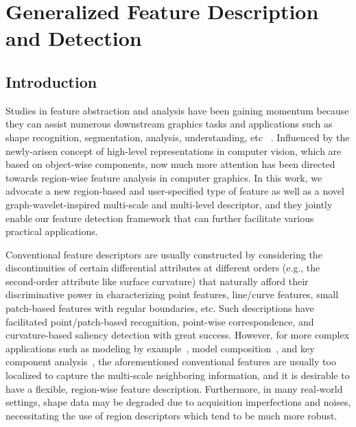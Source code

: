 \chapter{Generalized Feature Description and Detection}

\section{Introduction}

Studies in feature abstraction and analysis have been
gaining momentum because they can assist numerous downstream graphics
tasks and applications such as shape recognition, segmentation,
analysis, understanding, etc
~\cite{Bronstein2011,Kin-ChungAu:2012,Song:2014:MSV}. Influenced
by the newly-arisen concept of high-level representations in computer
vision, which are based on object-wise components, now much more
attention has been directed towards region-wise feature analysis in
computer graphics. In this work, we advocate a new region-based and
user-specified type of feature as well as a novel
graph-wavelet-inspired multi-scale and multi-level descriptor, and they
jointly enable our feature detection framework that can further
facilitate various practical applications.

Conventional feature descriptors are usually constructed by considering
the discontinuities of certain differential attributes at different
orders (e.g., the second-order attribute like surface curvature) that
naturally afford their discriminative power in characterizing point
features, line/curve features, small patch-based features with regular
boundaries, etc. Such descriptions have facilitated point/patch-based
recognition, point-wise correspondence, and curvature-based saliency
detection with great success. However, for more complex applications
such as modeling by example~\cite{Funkhouser:2004}, model
composition~\cite{Kreavoy:2007}, and key component
analysis~\cite{Sipiran:2012}, the aforementioned conventional features
are usually too localized to capture the multi-scale neighboring
information, and it is desirable to have a flexible, region-wise feature
description. Furthermore, in many real-world settings, shape data may be
degraded due to acquisition imperfections and noises, necessitating the
use of region descriptors which tend to be much more robust.

